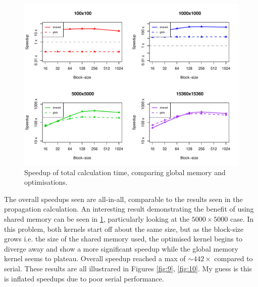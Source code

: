 \documentclass[12pt]{article}
\begin{document}
\begin{figure}
	\centering
	\includegraphics[width=\linewidth]{../plots/tot_globvshared.pdf}
	\caption{Speedup of total calculation time, comparing global memory and optimisations.}
	\label{fig:11}
\end{figure}
The overall speedups seen are all-in-all, comparable to the results seen in the propagation calculation. An interesting result demonstrating the benefit of using shared memory can be seen in \ref{fig:11}, particularly looking at the $5000\times5000$ case. In this problem, both kernels start off about the same size, but as the block-size grows i.e. the size of the shared memory used, the optimised kernel begins to diverge away and show a more significant speedup while the global memory kernel seems to plateau. Overall speedup reached a max of $\sim442\times$ compared to serial. These results are all illustrared in Figures \ref{fig:9}, \ref{fig:10}. My guess is this is inflated speedups due to poor serial performance.
\end{document}
